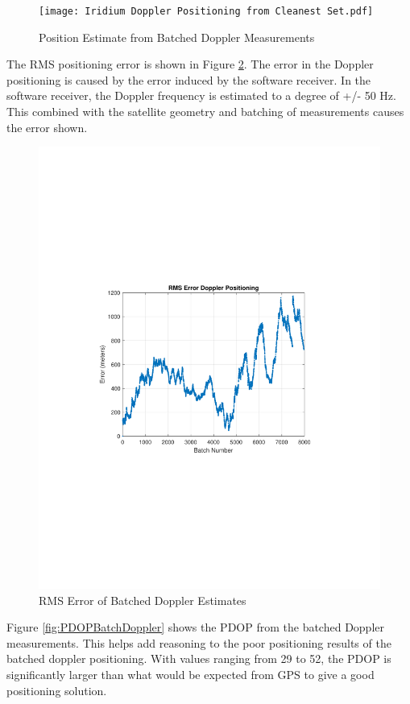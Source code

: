 \documentclass[12pt]{report}
\begin{document}
\begin{figure}[h!]
    \centering
    \texttt{[image: Iridium Doppler Positioning from Cleanest Set.pdf]}
    \caption{Position Estimate from Batched Doppler Measurements}
    \label{fig:cleaniriddopgeo}
\end{figure}
The RMS positioning error is shown in Figure \ref{fig:RMSErrorBatchDoppler}. The error in the Doppler positioning is caused by the error induced by the software receiver. In the software receiver, the Doppler frequency is estimated to a degree of +/- 50 Hz. This combined with the satellite geometry and batching of measurements causes the error shown. 

\begin{figure}[h!]
    \centering
    \includegraphics[trim=1.2in 3.3in 1.75in 3.3in,clip,width=5in]{Iridium RMSE plot Doppler Cleanest file.pdf}
    \caption{RMS Error of Batched Doppler Estimates}
    \label{fig:RMSErrorBatchDoppler}
\end{figure}

Figure \ref{fig:PDOPBatchDoppler} shows the PDOP from the batched Doppler measurements. This helps add reasoning to the poor positioning results of the batched doppler positioning. With values ranging from 29 to 52, the PDOP is significantly larger than what would be expected from GPS to give a good positioning solution. 
\end{document}
